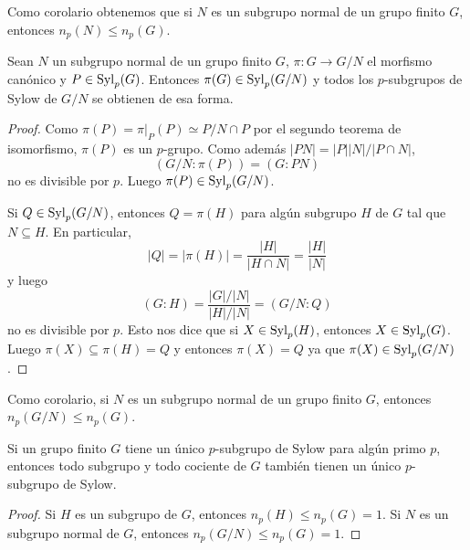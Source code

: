 Como corolario obtenemos que si $N$ es un subgrupo normal de un grupo finito $G$, entonces 
$n_p(N)\leq n_p(G)$. 

\begin{theorem}
	Sean $N$ un subgrupo normal de un grupo finito $G$, $\pi\colon G\to
	G/N$ el morfismo canónico y $P\in\mathrm{Syl}_p(G)$. Entonces
	$\pi(G)\in\mathrm{Syl}_p(G/N)$ y todos los $p$-subgrupos de Sylow de $G/N$ se
	obtienen de esa forma. 
\end{theorem}

\begin{proof}
	Como $\pi(P)=\pi|_{P}(P)\simeq P/N\cap P$ por el segundo teorema de
	isomorfismo, $\pi(P)$ es un $p$-grupo.  Como además $|PN|=|P||N|/|P\cap
	N|$, 
	\[
		(G/N:\pi(P))=(G:PN)
	\]
	no es divisible por $p$. Luego $\pi(P)\in\mathrm{Syl}_p(G/N)$. 
	
	Si $Q\in\mathrm{Syl}_p(G/N)$, entonces $Q=\pi(H)$ para algún subgrupo $H$ de $G$
	tal que $N\subseteq H$. En particular, 
	\[
		|Q|=|\pi(H)|=\frac{|H|}{|H\cap N|}=\frac{|H|}{|N|}
	\]
	y luego
	\[
		(G:H)=\frac{|G|/|N|}{|H|/|N|}=(G/N:Q)
	\]
	no es divisible por $p$. Esto nos dice que si $X\in\mathrm{Syl}_p(H)$, entonces
	$X\in\mathrm{Syl}_p(G)$. Luego $\pi(X)\subseteq\pi(H)=Q$ y entonces $\pi(X)=Q$ ya
	que $\pi(X)\in\mathrm{Syl}_p(G/N)$.
\end{proof}

Como corolario, si $N$ es un subgrupo normal de un grupo finito $G$, entonces 
$n_p(G/N)\leq n_p(G)$. 

\begin{corollary}
Si un grupo finito $G$ tiene un único $p$-subgrupo de Sylow para algún
primo $p$, entonces todo subgrupo y todo cociente de $G$ también tienen un
único $p$-subgrupo de Sylow.
\end{corollary}

\begin{proof}
	Si $H$ es un subgrupo de $G$, entonces $n_p(H)\leq n_p(G)=1$. Si $N$ es un subgrupo
	normal de $G$, entonces $n_p(G/N)\leq n_p(G)=1$. 	
\end{proof}

%
%
%
%
